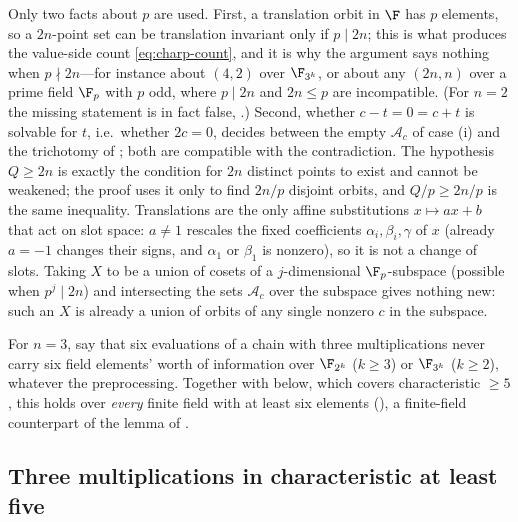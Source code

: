 \begin{remark}
\label{rem:charp-scope}
Only two facts about $p$ are used.  First, a translation orbit in $\F$ has $p$ elements,
so a $2n$-point set can be translation invariant only if $p\mid 2n$; this is what produces
the value-side count \eqref{eq:charp-count}, and it is why the argument says nothing when
$p\nmid 2n$---for instance about $(4,2)$ over $\F_{3^k}$, or about any $(2n,n)$ over a
prime field $\F_p$ with $p$ odd, where $p\mid 2n$ and $2n\le p$ are incompatible.  (For
$n=2$ the missing statement is in fact false, .)  Second, whether
$c-t=0=c+t$ is solvable for $t$, i.e.\ whether $2c=0$, decides between the empty
$\mathcal A_c$ of case (i) and the trichotomy of ; both are
compatible with the contradiction.  The hypothesis $Q\ge2n$ is exactly the condition for
$2n$ distinct points to exist and cannot be weakened; the proof uses it only to find
$2n/p$ disjoint orbits, and $Q/p\ge2n/p$ is the same inequality.  Translations are the
only affine substitutions $x\mapsto ax+b$ that act on slot space: $a\neq1$ rescales the
fixed coefficients $\alpha_i,\beta_i,\gamma$ of $x$ (already $a=-1$ changes their signs,
and $\alpha_1$ or $\beta_1$ is nonzero), so it is not a change of slots.  Taking $X$ to be
a union of cosets of a $j$-dimensional $\F_p$-subspace (possible when $p^j\mid 2n$) and
intersecting the sets $\mathcal A_c$ over the subspace gives nothing new: such an $X$ is
already a union of orbits of any single nonzero $c$ in the subspace.
\end{remark}

\begin{remark}
\label{rem:charp-degree6}
For $n=3$,  say that six evaluations of a chain with
three multiplications never carry six field elements' worth of information over
$\F_{2^k}$ ($k\ge3$) or $\F_{3^k}$ ($k\ge2$), whatever the preprocessing.  Together with
 below, which covers characteristic $\ge5$, this holds over
\emph{every} finite field with at least six elements (), a
finite-field counterpart of the lemma of .
\end{remark}

\subsection{Three multiplications in characteristic at least five}
\label{sec:charp-n3}

